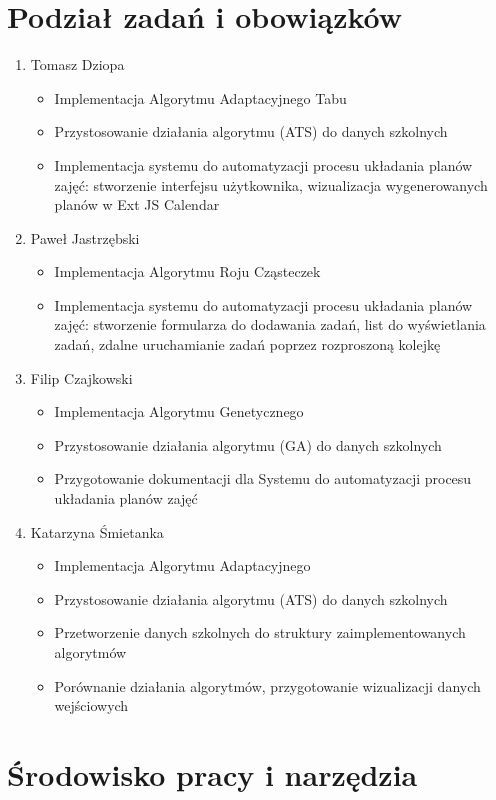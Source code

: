 \section{Podział zadań i obowiązków}
\begin{enumerate}
\item Tomasz Dziopa 
\begin{itemize}
\item Implementacja Algorytmu Adaptacyjnego Tabu
\item Przystosowanie działania algorytmu (ATS) do danych szkolnych
\item Implementacja systemu do automatyzacji procesu układania planów zajęć: stworzenie interfejsu użytkownika, wizualizacja wygenerowanych planów w Ext JS Calendar
\end{itemize}
\item Paweł Jastrzębski
\begin{itemize}
\item Implementacja Algorytmu Roju Cząsteczek
\item Implementacja systemu do automatyzacji procesu układania planów zajęć: stworzenie formularza do dodawania zadań, list do wyświetlania zadań, zdalne uruchamianie zadań poprzez rozproszoną kolejkę 
\end{itemize}
\item Filip Czajkowski
\begin{itemize}
\item Implementacja Algorytmu Genetycznego
\item Przystosowanie działania algorytmu (GA) do danych szkolnych
\item Przygotowanie dokumentacji dla Systemu do automatyzacji procesu układania planów zajęć
\end{itemize}
\item Katarzyna Śmietanka
\begin{itemize}
\item Implementacja Algorytmu Adaptacyjnego
\item Przystosowanie działania algorytmu (ATS) do danych szkolnych
\item Przetworzenie danych szkolnych do struktury zaimplementowanych algorytmów
\item Porównanie działania algorytmów, przygotowanie wizualizacji danych wejściowych
\end{itemize}
\end{enumerate}
\section{Środowisko pracy i narzędzia}
